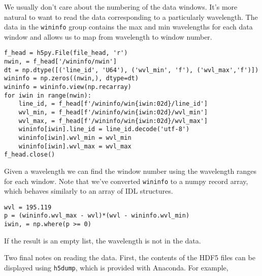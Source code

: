 We usually don't care about the numbering of the data windows. It's more natural to want to read
the data corresponding to a particularly wavelength. The data in the \verb+wininfo+ group contains
the max and min wavelengths for each data window and allows us to map from wavelength to window
number.
\begin{lstlisting}
f_head = h5py.File(file_head, 'r')
nwin, = f_head['/wininfo/nwin']
dt = np.dtype([('line_id', 'U64'), ('wvl_min', 'f'), ('wvl_max','f')])
wininfo = np.zeros((nwin,), dtype=dt)
wininfo = wininfo.view(np.recarray)
for iwin in range(nwin):
    line_id, = f_head[f'/wininfo/win{iwin:02d}/line_id']
    wvl_min, = f_head[f'/wininfo/win{iwin:02d}/wvl_min']
    wvl_max, = f_head[f'/wininfo/win{iwin:02d}/wvl_max']
    wininfo[iwin].line_id = line_id.decode('utf-8')
    wininfo[iwin].wvl_min = wvl_min
    wininfo[iwin].wvl_max = wvl_max
f_head.close()
\end{lstlisting}
Given a wavelength we can find the window number using the wavelength ranges for each window. Note
that we've converted \verb+wininfo+ to a numpy record array, which behaves similarly to an array of
IDL structures.
\begin{lstlisting}
wvl = 195.119
p = (wininfo.wvl_max - wvl)*(wvl - wininfo.wvl_min)
iwin, = np.where(p >= 0)
\end{lstlisting}
If the result is an empty list, the wavelength is not in the data.

Two final notes on reading the data. First, the contents of the HDF5 files can be displayed using
\verb+h5dump+, which is provided with Anaconda. For example,

